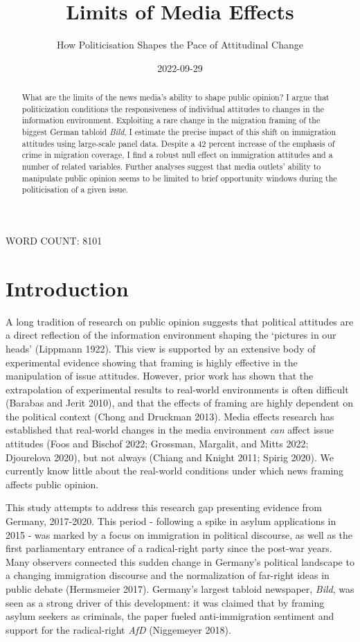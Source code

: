 \documentclass[
  12pt,
]{article}
\title{Limits of Media Effects}
\subtitle{How Politicisation Shapes the Pace of Attitudinal Change}
\author{}
\date{\vspace{-2.5em}2022-09-29}
\begin{document}
\maketitle
\begin{abstract}
What are the limits of the news media's ability to shape public opinion? I argue that politicization conditions the responsiveness of individual attitudes to changes in the information environment. Exploiting a rare change in the migration framing of the biggest German tabloid \emph{Bild}, I estimate the precise impact of this shift on immigration attitudes using large-scale panel data. Despite a 42 percent increase of the emphasis of crime in migration coverage, I find a robust null effect on immigration attitudes and a number of related variables. Further analyses suggest that media outlets' ability to manipulate public opinion seems to be limited to brief opportunity windows during the politicisation of a given issue.
\end{abstract}

\medskip

WORD COUNT: 8101

\pagebreak

\doublespacing

\hypertarget{introduction}{%
\section{Introduction}\label{introduction}}

A long tradition of research on public opinion suggests that political attitudes are a direct reflection of the information environment shaping the `pictures in our heads' (Lippmann 1922). This view is supported by an extensive body of experimental evidence showing that framing is highly effective in the manipulation of issue attitudes. However, prior work has shown that the extrapolation of experimental results to real-world environments is often difficult (Barabas and Jerit 2010), and that the effects of framing are highly dependent on the political context (Chong and Druckman 2013). Media effects research has established that real-world changes in the media environment \emph{can} affect issue attitudes (Foos and Bischof 2022; Grossman, Margalit, and Mitts 2022; Djourelova 2020), but not always (Chiang and Knight 2011; Spirig 2020). We currently know little about the real-world conditions under which news framing affects public opinion.

This study attempts to address this research gap presenting evidence from Germany, 2017-2020. This period - following a spike in asylum applications in 2015 - was marked by a focus on immigration in political discourse, as well as the first parliamentary entrance of a radical-right party since the post-war years. Many observers connected this sudden change in Germany's political landscape to a changing immigration discourse and the normalization of far-right ideas in public debate (Hermsmeier 2017). Germany's largest tabloid newspaper, \emph{Bild}, was seen as a strong driver of this development: it was claimed that by framing asylum seekers as criminals, the paper fueled anti-immigration sentiment and support for the radical-right \emph{AfD} (Niggemeyer 2018).
\end{document}
